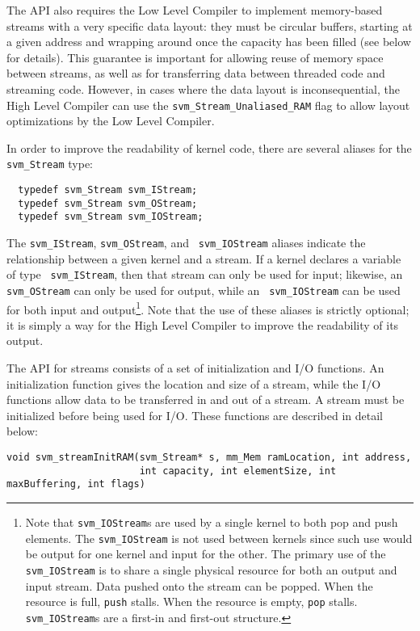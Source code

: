 The API also requires the Low Level Compiler to implement memory-based
streams with a very specific data layout: they must be circular
buffers, starting at a given address and wrapping around once the
capacity has been filled (see below for details).  This guarantee is
important for allowing reuse of memory space between streams, as well
as for transferring data between threaded code and streaming code.
However, in cases where the data layout is inconsequential, the High
Level Compiler can use the {\tt svm\_Stream\_Unaliased\_RAM} flag to allow
layout optimizations by the Low Level Compiler.

In order to improve the readability of kernel code, there are several
aliases for the {\tt svm\_Stream} type:
{\small
\begin{verbatim}
  typedef svm_Stream svm_IStream;
  typedef svm_Stream svm_OStream;
  typedef svm_Stream svm_IOStream;
\end{verbatim}}
\noindent The {\tt svm\_IStream}, {\tt svm\_OStream}, and {\tt
svm\_IOStream} aliases indicate the relationship between a given
kernel and a stream.  If a kernel declares a variable of type {\tt
svm\_IStream}, then that stream can only be used for input; likewise,
an {\tt svm\_OStream} can only be used for output, while an {\tt
svm\_IOStream} can be used for both input and output\footnote{Note
that {\tt svm\_IOStream}s are used by a single kernel to both pop and
push elements.  The {\tt svm\_IOStream} is not used between kernels
since such use would be output for one kernel and input for the
other. The primary use of the {\tt svm\_IOStream} is to share a single
physical resource for both an output and input stream.  Data pushed
onto the stream can be popped.  When the resource is full, {\tt push}
stalls.  When the resource is empty, {\tt pop} stalls.  {\tt
svm\_IOStream}s are a first-in and first-out structure.}.  Note that
the use of these aliases is strictly optional; it is simply a way for
the High Level Compiler to improve the readability of its output.

The API for streams consists of a set of initialization and I/O
functions.  An initialization function gives the location and size of
a stream, while the I/O functions allow data to be transferred in and
out of a stream.  A stream must be initialized before being used for
I/O.  These functions are described in detail below:
\clearpage
~ \\ \vspace{-24pt} 
\makeline
{}
{\small
\begin{verbatim}
void svm_streamInitRAM(svm_Stream* s, mm_Mem ramLocation, int address, 
                       int capacity, int elementSize, int maxBuffering, int flags)
\end{verbatim}}

